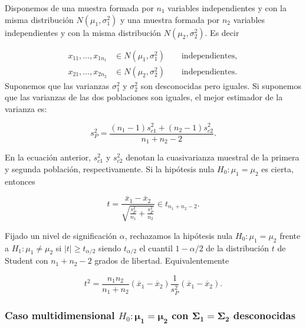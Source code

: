 \documentclass[
  a4paper,
  oneside]{scrbook}
\theoremstyle{definition}
\theoremstyle{definition}
\theoremstyle{definition}
\theoremstyle{definition}
\theoremstyle{remark}
\begin{document}
Disponemos de una muestra formada por \(n_1\) variables independientes y
con la misma distribución \(N(\mu_1, \sigma_1^2)\) y una muestra formada
por \(n_2\) variables independientes y con la misma distribución
\(N(\mu_2, \sigma_2^2)\). Es decir

\[\begin{aligned}
{x_{11}},\ldots,{x_{1n_1}}&\in  N({\mu_1},\sigma_1^2) \qquad \mbox{independientes},\\
{x_{21}},\ldots,{x_{2n_2}}&\in  N({\mu_2},\sigma_2^2) \qquad \mbox{independientes}.\end{aligned}\]
Suponemos que las varianzas \(\sigma_1^2\) y \(\sigma_2^2\) son desconocidas
pero iguales. Si suponemos que las varianzas de las dos poblaciones son
iguales, el mejor estimador de la varianza es:

\[{s}_{P}^2 = \frac{(n_1 - 1) {s}_{c1}^2 + (n_2 - 1) {s}_{c2}^2 }{n_1 + n_2 -2}.\]

En la ecuación anterior, \({s}_{c1}^2\) y \({s}_{c2}^2\) denotan la
cuasivarianza muestral de la primera y segunda población,
respectivamente. Si la hipótesis nula \(H_0:\mu_1=\mu_2\) es cierta,
entonces

\[t=\frac{\overline{x}_1 -\overline{x}_2}{\sqrt{\frac{s_{P}^2}{n_1} +\frac{s_P^2}{n_2} }} \in t_{n_1+n_2-2}.\]

Fijado un nivel de significación \(\alpha\), rechazamos la hipótesis nula
\(H_0:\mu_1=\mu_2\) frente a \(H_1:\mu_1\neq\mu_2\) si
\(\left|t\right|\geq t_{\alpha/2}\) siendo \(t_{\alpha/2}\) el cuantil
\(1-\alpha/2\) de la distribución \(t\) de Student con \(n_1+n_2-2\) grados de
libertad. Equivalentemente

\begin{equation}
t^2=\frac{n_1n_2}{n_1+n_2}(\overline{x}_1 -\overline{x}_2)\frac{1}{s_{P}^2}(\overline{x}_1 -\overline{x}_2).
\label{eq:t22}
\end{equation}

\subsubsection{\texorpdfstring{Caso multidimensional \(H_0:\bm{\mu_1}=\bm{\mu_2}\) con \(\bm{\Sigma_1}=\bm{\Sigma_2}\) desconocidas}{Caso multidimensional H\_0:\textbackslash bm\{\textbackslash mu\_1\}=\textbackslash bm\{\textbackslash mu\_2\} con \textbackslash bm\{\textbackslash Sigma\_1\}=\textbackslash bm\{\textbackslash Sigma\_2\} desconocidas}}\label{caso-multidimensional-h-0-bm-mu-1-bm-mu-2-con-bm-sigma-1-bm-sigma-2-desconocidas}
\end{document}
